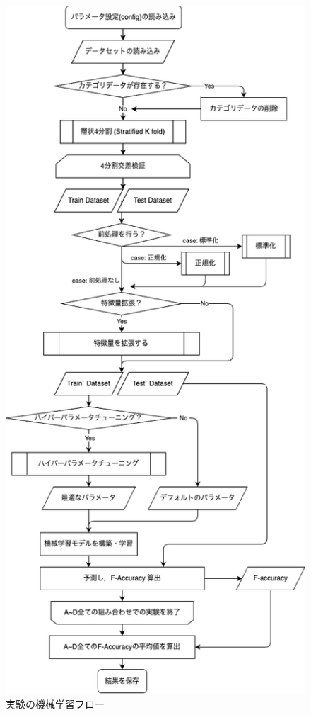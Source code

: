 \begin{figure}[htbp]  
  \centering
  \includegraphics[width=0.6\linewidth\centering]{figures/ml-flow.png}
  \caption{実験の機械学習フロー}
  \label{fig:ml-flow}
\end{figure}
